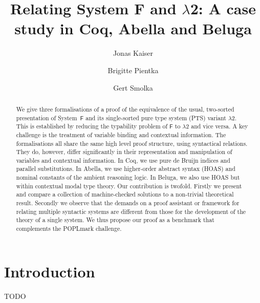\documentclass[a4paper,UKenglish]{lipics-v2016}
\title{Relating System F and $\lambda$2: A case study in Coq, Abella and Beluga}
\author[1]{Jonas Kaiser}
\author[2]{Brigitte Pientka}
\author[1]{Gert Smolka}
\affil[1]{Saarland University, Saarbrücken, Germany\\
  \texttt{[jkaiser,smolka]}@ps.uni-saarland.de}
\affil[2]{school, city, country\\
  \texttt{MAIL}}
\newcommand{\SysF}{\ensuremath{\mathsf{F}}\xspace}
\newcommand{\SysL}{$\lambda$2\xspace}
\begin{document}
\maketitle

\begin{abstract}
  We give three formalisations of a proof of the equivalence of the usual, two-sorted presentation of System~\SysF and its single-sorted pure type system (PTS) variant \SysL.
  This is established by reducing the typability problem of \SysF to \SysL and vice versa.
  A key challenge is the treatment of variable binding and contextual information.
  The formalisations all share the same high level proof structure, using syntactical relations.
  They do, however, differ significantly in their representation and manipulation of variables and contextual information.
  In Coq, we use pure de Bruijn indices and parallel substitutions.
  In Abella, we use higher-order abstract syntax (HOAS) and nominal constants of the ambient reasoning logic.
  In Beluga, we also use HOAS but within contextual modal type theory.
  Our contribution is twofold.
  Firstly we present and compare a collection of machine-checked solutions to a non-trivial theoretical result.
  Secondly we observe that the demands on a proof assistant or framework for relating multiple syntactic systems are different from those for the development of the theory of a single system.
  We thus propose our proof as a benchmark that complements the POPLmark challenge.
\end{abstract}

\section{Introduction}

TODO
\end{document}
